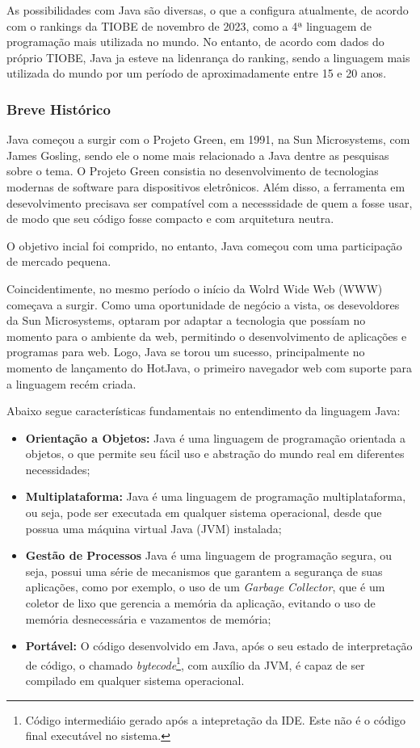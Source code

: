 \documentclass[a4paper,12pt]{article}
\begin{document}
As possibilidades com Java são diversas, o que a configura atualmente, de acordo com o rankings da TIOBE de novembro de 2023, como a 4ª linguagem de programação
mais utilizada no mundo. No entanto, de acordo com dados do próprio TIOBE, Java ja esteve na lidenrança do ranking, sendo a linguagem mais utilizada do mundo
por um período de aproximadamente entre 15 e 20 anos.

\subsubsection{Breve Histórico}
Java começou a surgir com o Projeto Green, em 1991, na Sun Microsystems, com James Gosling, sendo ele o nome mais relacionado a Java dentre as pesquisas 
sobre o tema. O Projeto Green consistia no desenvolvimento de tecnologias modernas de software para dispositivos eletrônicos. Além disso, a ferramenta
em desevolvimento precisava ser compatível com a necesssidade de quem a fosse usar, de modo que seu código fosse compacto e com arquitetura neutra.

O objetivo incial foi comprido, no entanto, Java começou com uma participação de mercado pequena. 

Coincidentimente, no mesmo período o início da Wolrd Wide Web (WWW) começava a surgir. Como uma oportunidade de negócio a vista, os desevoldores da Sun
Microsystems, optaram por adaptar a tecnologia que possíam no momento para o ambiente da web, permitindo o desenvolvimento de aplicações e programas para web.
Logo, Java se torou um sucesso, principalmente no momento de lançamento do HotJava, o primeiro navegador web com suporte para a linguagem recém criada.

Abaixo segue características fundamentais no entendimento da linguagem Java:
\begin{itemize}
	\item \textbf{Orientação a Objetos:} Java é uma linguagem de programação orientada a objetos, o que permite seu fácil uso e abstração do mundo real em diferentes necessidades;
	\item \textbf{Multiplataforma:} Java é uma linguagem de programação multiplataforma, ou seja, pode ser executada em qualquer sistema operacional, desde que possua uma máquina virtual Java (JVM) instalada;
	\item \textbf{Gestão de Processos} Java é uma linguagem de programação segura, ou seja, possui uma série de mecanismos que garantem a segurança de suas aplicações, como por exemplo, o uso de um \textit{Garbage Collector}, 
	que é um coletor de lixo que gerencia a memória da aplicação, evitando o uso de memória desnecessária e vazamentos de memória;
	\item \textbf{Portável:} O código desenvolvido em Java, após o seu estado de interpretação de código, o chamado \textit{bytecode}\footnote{
		Código intermediáio gerado após a intepretação da IDE. Este não é o código final executável no sistema.
	}, com auxílio da JVM, é capaz de ser compilado em qualquer sistema operacional.
\end{itemize}
\end{document}
